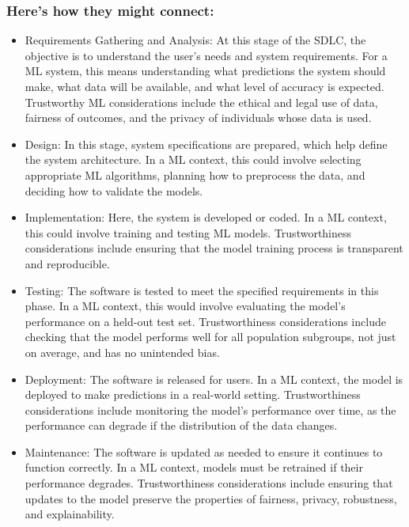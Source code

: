 \documentclass[a4paper,11pt]{article}
\begin{document}
\subsubsection{Here's how they might connect:}
\begin{itemize}
\item Requirements Gathering and Analysis: At this stage of the SDLC, the objective is to understand the user's needs and system requirements. For a ML system, this means understanding what predictions the system should make, what data will be available, and what level of accuracy is expected. Trustworthy ML considerations include the ethical and legal use of data, fairness of outcomes, and the privacy of individuals whose data is used.

\item Design: In this stage, system specifications are prepared, which help define the system architecture. In a ML context, this could involve selecting appropriate ML algorithms, planning how to preprocess the data, and deciding how to validate the models. 

\item Implementation: Here, the system is developed or coded. In a ML context, this could involve training and testing ML models. Trustworthiness considerations include ensuring that the model training process is transparent and reproducible.

\item Testing: The software is tested to meet the specified requirements in this phase. In a ML context, this would involve evaluating the model's performance on a held-out test set. Trustworthiness considerations include checking that the model performs well for all population subgroups, not just on average, and has no unintended bias.

\item Deployment: The software is released for users. In a ML context, the model is deployed to make predictions in a real-world setting. Trustworthiness considerations include monitoring the model's performance over time, as the performance can degrade if the distribution of the data changes.

\item Maintenance: The software is updated as needed to ensure it continues to function correctly. In a ML context, models must be retrained if their performance degrades. Trustworthiness considerations include ensuring that updates to the model preserve the properties of fairness, privacy, robustness, and explainability.

\end{itemize}
\end{document}
